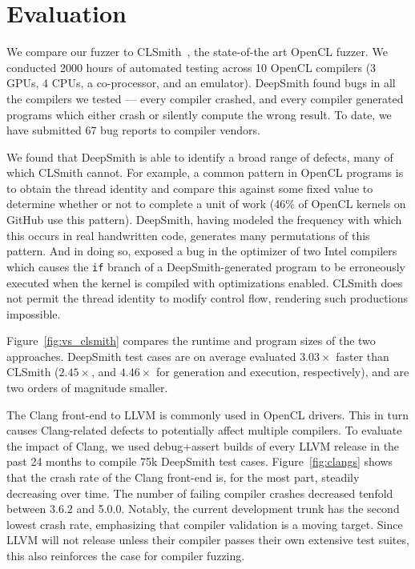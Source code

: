 \section{Evaluation}

We compare our fuzzer to CLSmith~\cite{Lidbury2015a}, the state-of-the art
OpenCL fuzzer. We conducted 2000 hours of automated testing across 10 OpenCL
compilers (3 GPUs, 4 CPUs, a co-processor, and an emulator). DeepSmith found
bugs in all the compilers we tested --- every compiler crashed, and every
compiler generated programs which either crash or silently compute the wrong
result. To date, we have submitted 67 bug reports to compiler vendors.

We found that DeepSmith is able to identify a broad range of defects, many of
which CLSmith cannot. For example, a common pattern in OpenCL programs is to
obtain the thread identity and compare this against some fixed value to
determine whether or not to complete a unit of work (46\% of OpenCL kernels on
GitHub use this pattern). DeepSmith, having modeled the frequency with which
this occurs in real handwritten code, generates many permutations of this
pattern. And in doing so, exposed a bug in the optimizer of two Intel compilers
which causes the \texttt{if} branch of a DeepSmith-generated program to be
erroneously executed when the kernel is compiled with optimizations enabled.
CLSmith does not permit the thread identity to modify control flow, rendering
such productions impossible.

Figure~\ref{fig:vs_clsmith} compares the runtime and program sizes of the two
approaches. DeepSmith test cases are on average evaluated $3.03\times$ faster
than CLSmith ($2.45\times$, and $4.46\times$ for generation and execution,
respectively), and are two orders of magnitude smaller.

The Clang front-end to LLVM is commonly used in OpenCL drivers. This in turn
causes Clang-related defects to potentially affect multiple compilers. To
evaluate the impact of Clang, we used debug+assert builds of every LLVM release
in the past 24 months to compile 75k DeepSmith test cases.
Figure~\ref{fig:clangs} shows that the crash rate of the Clang front-end is, for
the most part, steadily decreasing over time. The number of failing compiler
crashes decreased tenfold between 3.6.2 and 5.0.0. Notably, the current
development trunk has the second lowest crash rate, emphasizing that compiler
validation is a moving target. Since LLVM will not release unless their compiler
passes their own extensive test suites, this also reinforces the case for
compiler fuzzing.
\vspace{-1em}
